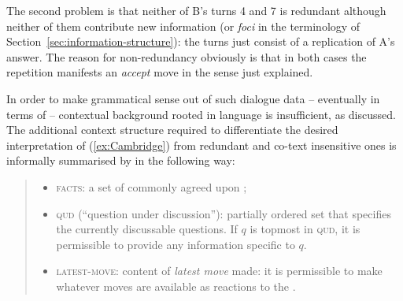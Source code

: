 \documentclass[output=paper]{langsci/langscibook}
\begin{document}
The second problem is that neither of B's turns 4 and 7 is redundant although neither of them contribute new information (or \emph{foci} in the terminology of Section~\ref{sec:information-structure}): the turns just consist of a replication of A's answer.
%
The reason for non-redundancy obviously is that in both cases the repetition manifests an \emph{accept}  move in the sense just explained.


In order to make grammatical sense out of such dialogue data -- eventually in terms of  -- contextual background rooted in language  is insufficient, as discussed.
%
The additional context structure required to differentiate the desired interpretation of (\ref{ex:Cambridge}) from redundant and co-text insensitive ones is informally summarised by \citet[p.~4]{Ginzburg:1994} in the following way:
%
\begin{quote}
  \begin{itemize}
  \item \textsc{facts}:  a set of commonly agreed upon ;
  \item \textsc{qud}  (\enquote{question under discussion}):  partially ordered set that specifies the currently discussable questions. If $q$ is topmost in \textsc{qud}, it is permissible to provide any information specific to $q$.
  \item \textsc{latest-move}:  content of \emph{latest move} made: it is permissible to make whatever moves are available as reactions to the .
  \end{itemize}
\end{quote}
\end{document}
